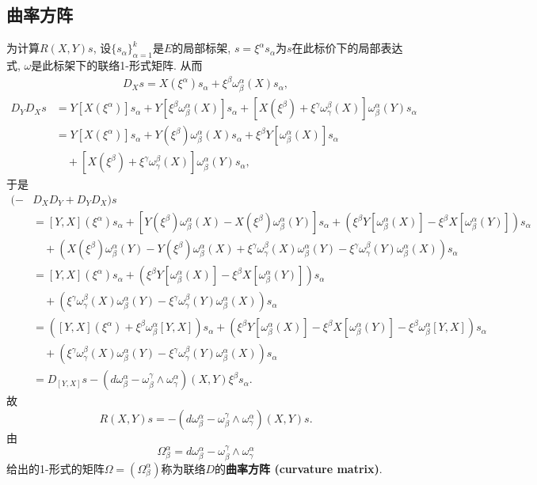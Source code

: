 \subsection{曲率方阵}
为计算$R(X,Y)s$, 设$\{s_\alpha\}_{\alpha=1}^k$是$E$的局部标架, $s=\xi^\alpha s_\alpha$为$s$在此标价下的局部表达式, $\omega$是此标架下的联络1-形式矩阵. 从而
$$
\begin{aligned}
D_Xs=X(\xi^\alpha)s_\alpha+\xi^\beta\omega_\beta^\alpha(X) s_\alpha,
\end{aligned}
$$
$$
\begin{aligned}
D_YD_Xs&=Y[X(\xi^\alpha)]s_\alpha+Y[\xi^\beta\omega_\beta^\alpha(X)] s_\alpha
+[X(\xi^\beta)+\xi^\gamma\omega_\gamma^\beta(X)]\omega_\beta^\alpha(Y) s_\alpha \\
&=Y[X(\xi^\alpha)]s_\alpha+Y(\xi^\beta)\omega_\beta^\alpha(X)s_\alpha+\xi^\beta Y[\omega_\beta^\alpha(X)]s_\alpha\\
&\quad+[X(\xi^\beta)+\xi^\gamma\omega_\gamma^\beta(X)]\omega_\beta^\alpha(Y) s_\alpha ,
\end{aligned}
$$
于是
$$
\begin{aligned}
(-&D_XD_Y+D_YD_X)s\\
&=[Y,X](\xi^\alpha)s_\alpha
+[Y(\xi^\beta)\omega_\beta^\alpha(X)-X(\xi^\beta)\omega_\beta^\alpha(Y)]s_\alpha+\left(\xi^\beta Y[\omega_\beta^\alpha(X)]-\xi^\beta X[\omega_\beta^\alpha(Y)]\right)s_\alpha\\
&\quad+\left(X(\xi^\beta)\omega_\beta^\alpha(Y)-Y(\xi^\beta)\omega_\beta^\alpha(X)+\xi^\gamma\omega_\gamma^\beta(X)\omega_\beta^\alpha(Y)-\xi^\gamma\omega_\gamma^\beta(Y)\omega_\beta^\alpha(X) \right)s_\alpha\\
&=[Y,X](\xi^\alpha)s_\alpha+\left(\xi^\beta Y[\omega_\beta^\alpha(X)]-\xi^\beta X[\omega_\beta^\alpha(Y)]\right)s_\alpha\\
&\quad+\left(\xi^\gamma\omega_\gamma^\beta(X)\omega_\beta^\alpha(Y)-\xi^\gamma\omega_\gamma^\beta(Y)\omega_\beta^\alpha(X) \right)s_\alpha\\
&=\left([Y,X](\xi^\alpha)+\xi^\beta\omega_\beta^\alpha[Y,X]\right)s_\alpha
+\left(\xi^\beta Y[\omega_\beta^\alpha(X)]-\xi^\beta X[\omega_\beta^\alpha(Y)]-\xi^\beta\omega_\beta^\alpha[Y,X]\right)s_\alpha\\
&\quad+\left(\xi^\gamma\omega_\gamma^\beta(X)\omega_\beta^\alpha(Y)-\xi^\gamma\omega_\gamma^\beta(Y)\omega_\beta^\alpha(X) \right)s_\alpha\\
&=D_{[Y,X]}s-(d\omega_\beta^\alpha-\omega_\beta^\gamma\wedge\omega_\gamma^\alpha)(X,Y)\xi^\beta s_\alpha.
\end{aligned}
$$
故
$$
R(X,Y)s=-(d\omega_\beta^\alpha-\omega_\beta^\gamma\wedge\omega_\gamma^\alpha)(X,Y)s.
$$
由
$$
\Omega_\beta^\alpha=d\omega_\beta^\alpha-\omega_\beta^\gamma\wedge\omega_\gamma^\alpha
$$
给出的1-形式的矩阵$\Omega=(\Omega_\beta^\alpha)$称为联络$D$的\textbf{曲率方阵 (curvature matrix)}. 

